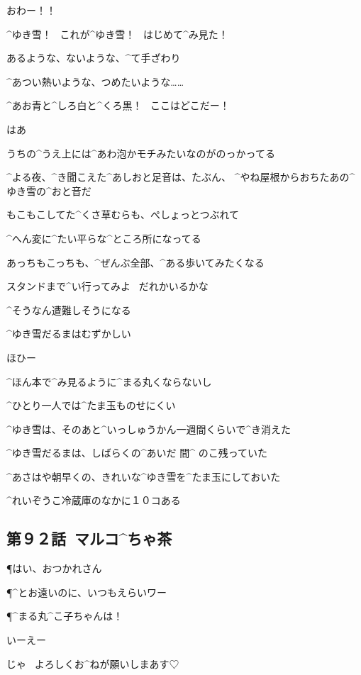 \page[42]
\A おわー！！

\page[44]
\A ^{ゆき}{雪}！
\ これが^{ゆき}{雪}！
\ はじめて^{み}{見}た！

\A あるような、ないような、^{て}{手}ざわり

\A ^{あつい}{熱い}ような、つめたいような……

\page
\A ^{あお}{青}と^{しろ}{白}と^{くろ}{黒}！
\ ここはどこだー！

\page
\A はあ

\page
\A うちの^{うえ}{上}には^{あわ}{泡}かモチみたいなのがのっかってる

\A ^{よる}{夜}、^{き}{聞}こえた^{あしおと}{足音}は、たぶん、
^{やね}{屋根}からおちたあの^{ゆき}{雪}の^{おと}{音}だ

\A もこもこしてた^{くさ}{草}むらも、ぺしょっとつぶれて

\A ^{へん}{変}に^{たい}{平}らな^{ところ}{所}になってる

\page
\A あっちもこっちも、^{ぜんぶ}{全部}、^{ある}{歩}いてみたくなる

\A スタンドまで^{い}{行}ってみよ
\ だれかいるかな

\A ^{そうなん}{遭難}しそうになる

\page
\A ^{ゆき}{雪}だるまはむずかしい

\A ほひー

\A ^{ほん}{本}で^{み}{見}るように^{まる}{丸}くならないし

\A ^{ひとり}{一人}では^{たま}{玉}ものせにくい

\page[51]
\A ^{ゆき}{雪}は、そのあと^{いっしゅうかん}{一週間}くらいで^{き}{消}えた

\A ^{ゆき}{雪}だるまは、しばらくの^{あいだ }{間}^{ のこ}{残}っていた

\page
\A ^{あさはや}{朝早}くの、きれいな^{ゆき}{雪}を^{たま}{玉}にしておいた

\A ^{れいぞうこ}{冷蔵庫}のなかに１０コある


\subsection{第９２話\ マルコ^{ちゃ}{茶}}

\page[56]
\P はい、おつかれさん

\P ^{とお}{遠}いのに、いつもえらいワー

\P ^{まる}{丸}^{こ}{子}ちゃんは！

\R いーえー

\R じゃ
\ よろしくお^{ねが}{願}いしまあす♡

